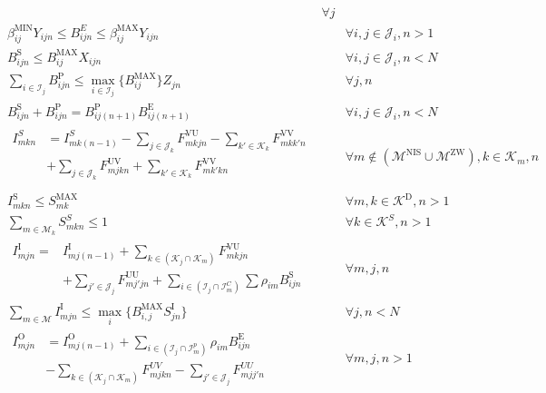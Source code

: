\begin{align}
\begin{aligned}
\end{aligned} && \forall j \\
	& \beta_{ij}^\text{MIN} Y_{ijn} \le B_{ijn}^E  \le \beta_{ij}^\text{MAX} Y_{ijn} && \forall i, j \in \mathcal{J}_i, n > 1 \\
	& B_{ijn}^{\text{S}} \le B_{ij}^{\text{MAX}} X_{ijn} && \forall i, j \in \mathcal{J}_i, n < N \\
	& \sum_{i \in \mathcal{I}_j} B_{ijn}^{\text{P}} \le \max_{i \in \mathcal{I}_j} \{ B_{ij}^{\text{MAX}}\} Z_{jn} && \forall j, n \\
	& B_{ijn}^\text{S} + B_{ijn}^\text{P} = B_{ij(n+1)}^\text{P} B_{ij(n+1)}^\text{E} && \forall i, j \in \mathcal{J}_i, n < N \\
&\begin{aligned}
I_{mkn}^S &= I_{mk(n-1)}^S - \sum_{j \in \mathcal{J}_k} F_{mkjn}^{\text{VU}} - \sum_{k' \in \mathcal{K}_k} F_{mkk'n}^{\text{VV}}   \\ &+ \sum_{j \in \mathcal{J}_k} F_{mjkn}^{\text{UV}} + \sum_{k' \in \mathcal{K}_k} F_{mk'kn}^{\text{VV}} \\
\end{aligned} && \forall m \notin (\mathcal{M}^{\text{NIS}} \cup \mathcal{M}^\text{ZW}), k \in \mathcal{K}_m , n \\
	& I_{mkn}^\text{S} \le S_{mk}^{\text{MAX}} && \forall m, k \in \mathcal{K}^\text{D}, n>1 \\
	& \sum_{m \in \mathcal{M}_k} S_{mkn}^{S} \le 1 && \forall k \in \mathcal{K}^S, n > 1 \\
&\begin{aligned}
I_{mjn}^\text{I} = &I_{mj(n-1)}^{\text{I}} + \sum_{k \in (\mathcal{K}_j \cap \mathcal{K}_m)} F_{mkjn}^{\text{VU}}  \\ &+  \sum_{j' \in \mathcal{J}_j} F_{mj'jn}^{\text{UU}} + \sum_{i \in (\mathcal{I}_j \cap \mathcal{I}_m^C)} \sum \rho_{im} B_{ijn}^\text{S}
\end{aligned} && \forall m, j, n \\
& \sum_{m \in \mathcal{M}} I^{\text{I}}_{mjn} \le \max_i \{B_{i,j}^{\text{MAX}} S_{jn}^{\text{I}} \} && \forall j, n < N \\
&\begin{aligned}
I_{mjn}^\text{O} &= I_{mj(n-1)}^\text{O} + \sum_{i \in (\mathcal{I}_j \cap \mathcal{I}_m^p)} \rho_{im} B_{ijn}^\text{E}  \\ &- \sum_{k \in (\mathcal{K}_j \cap \mathcal{K}_m)} F^{UV}_{mjkn} - \sum_{j' \in \mathcal{J}_j} F^{UU}_{mjj'n}
\end{aligned}  &&\forall m, j , n > 1 \\

\end{align}
